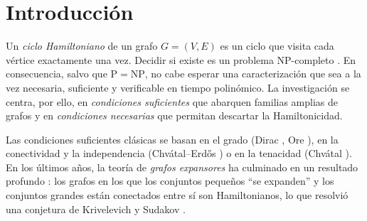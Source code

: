\documentclass[11pt,a4paper]{article}
\theoremstyle{definition}
\theoremstyle{remark}
\begin{document}
\begin{abstract}
verificación exhaustiva la cumple con margen, y mediante un lema de amplificación y una contracción que produce un multigrafo $4$-regular con transiciones prohibidas la encajamos entre la conjetura de Sheehan y un refuerzo suyo localizado en cuatro vértices. La conjetura principal queda intacta: en todos los contraejemplos $k^*$ vale $3$ o $4$ frente a valores de $D$ que llegan a $n-5$, de modo que lo refutado es la ruta y no el destino. Para grafos con $\delta\ge n/2$ probamos que basta el orden $2$ cuando el 2-factor tiene dos ciclos y el grado mínimo supera el umbral de Dirac en una unidad, y mostramos con un ejemplo de $8$ vértices que esa unidad es necesaria.
\end{abstract}

\section{Introducción}

Un \emph{ciclo Hamiltoniano} de un grafo $G=(V,E)$ es un ciclo que visita cada vértice exactamente una vez. Decidir si existe es un problema NP-completo \cite{karp}. En consecuencia, salvo que $\mathrm{P}=\mathrm{NP}$, no cabe esperar una caracterización que sea a la vez necesaria, suficiente y verificable en tiempo polinómico. La investigación se centra, por ello, en \emph{condiciones suficientes} que abarquen familias amplias de grafos y en \emph{condiciones necesarias} que permitan descartar la Hamiltonicidad.

Las condiciones suficientes clásicas se basan en el grado (Dirac \cite{dirac}, Ore \cite{ore}), en la conectividad y la independencia (Chvátal--Erdős \cite{chvatalerdos}) o en la tenacidad (Chvátal \cite{chvatal}). En los últimos años, la teoría de \emph{grafos expansores} ha culminado en un resultado profundo \cite{dmmps}: los grafos en los que los conjuntos pequeños ``se expanden'' y los conjuntos grandes están conectados entre sí son Hamiltonianos, lo que resolvió una conjetura de Krivelevich y Sudakov \cite{ks}.
\end{document}
